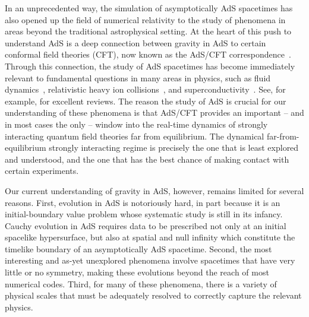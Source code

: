 \documentclass[a4paper,11pt]{article}
\numberwithin{equation}{section}
\begin{document}
In an unprecedented way, the simulation of asymptotically AdS spacetimes has also opened up the field of numerical relativity to the study of phenomena in areas beyond the traditional astrophysical setting.
At the heart of this push to understand AdS is a deep connection between gravity in AdS to certain conformal field theories (CFT), now known as the AdS/CFT correspondence~\cite{Maldacena:1997re,Gubser:1998bc,Witten:1998qj}. 
Through this connection, the study of AdS spacetimes has become immediately relevant to fundamental questions in many areas in physics, such as fluid dynamics~\cite{Baier:2007ix,Bhattacharyya:2010owp,Hubeny:2011hd}, relativistic heavy ion collisions~\cite{Chesler:2010bi,Casalderrey-Solana:2013aba,Casalderrey-Solana:2013sxa,Chesler:2015wra}, and superconductivity~\cite{Gubser:2008px,Hartnoll:2008kx,Hartnoll:2008vx}.
See, for example, \cite{CasalderreySolana:2011us,Chesler:2015lsa,Zaanen:2015oix,Hartnoll:2016apf} for excellent reviews. 
The reason the study of AdS is crucial for our understanding of these phenomena is that AdS/CFT provides an important -- and in most cases the only -- window into the real-time dynamics of strongly interacting quantum field theories far from equilibrium. 
The dynamical far-from-equilibrium strongly interacting regime is precisely the one that is least explored and understood, and the one that has the best chance of making contact with certain experiments.

Our current understanding of gravity in AdS, however, remains limited for several reasons.
First, evolution in AdS is notoriously hard, in part because it is an initial-boundary value problem whose systematic study is still in its infancy. 
Cauchy evolution in AdS requires data to be prescribed not only at an initial spacelike hypersurface, but also at spatial and null infinity which constitute the timelike boundary of an asymptotically AdS spacetime.
Second, the most interesting and as-yet unexplored phenomena involve spacetimes that have very little or no symmetry, making these evolutions beyond the reach of most numerical codes. 
Third, for many of these phenomena, there is a variety of physical scales that must be adequately resolved to correctly capture the relevant physics.
\end{document}
